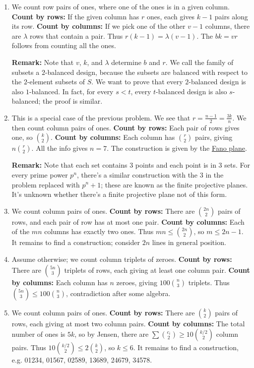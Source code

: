 \documentclass[11pt,paper=letter]{scrartcl}
\newcommand{\cbyrows}{{\bfseries \color{RowBlue} Count by rows: }}
\newcommand{\cbycols}{{\bfseries \color{ColOrange} Count by columns: }}
\begin{document}
\begin{enumerate}

\item We count row pairs of ones, where one of the ones is in a given column. \cbyrows If the given column has $r$ ones, each gives $k-1$ pairs along its row. \cbycols If we pick one of the other $v-1$ columns, there are $\lambda$ rows that contain a pair. Thus $r(k-1) = \lambda(v-1)$. The $bk = vr$ follows from counting all the ones.

\textbf{Remark:} Note that $v$, $k$, and $\lambda$ determine $b$ and $r$. We call the family of subsets a $2$-balanced design, because the subsets are balanced with respect to the $2$-element subsets of $S$. We want to prove that every $2$-balanced design is also $1$-balanced. In fact, for every $s < t$, every $t$-balanced design is also $s$-balanced; the proof is similar.

\item This is a special case of the previous problem. We see that $r = \frac{n-1}2 = \frac{3k}{n}$. We then count column pairs of ones. \cbyrows Each pair of rows gives one, so $\binom k2$. \cbycols Each column has $\binom r2$ pairs, giving $n\binom r2$. All the info gives $n = 7$. The construction is given by the \href{https://en.wikipedia.org/wiki/Fano_plane}{Fano plane}.

\textbf{Remark:} Note that each set contains $3$ points and each point is in $3$ sets. For every prime power $p^n$, there's a similar construction with the $3$ in the problem replaced with $p^n + 1$; these are known as the finite projective planes. It's unknown whether there's a finite projective plane not of this form.

\item We count column pairs of ones. \cbyrows There are $ \binom{2n}{2} $ pairs of rows, and each pair of row has at most one pair. \cbycols Each of the $mn$ columns has exactly two ones. Thus $mn \le \binom{2n}{2}$, so $m \le 2n - 1$. It remains to find a construction; consider $2n$ lines in general position.

\item Assume otherwise; we count column triplets of zeroes. \cbyrows There are $\binom{5n}{3}$ triplets of rows, each giving at least one column pair. \cbycols Each column has $n$ zeroes, giving $100 \binom{n}{3}$ triplets. Thus $\binom{5n}{3} \le 100 \binom{n}{3}$, contradiction after some algebra.

\item We count column pairs of ones. \cbyrows There are $\binom{k}{2}$ pairs of rows, each giving at most two column pairs. \cbycols The total number of ones is $5k$, so by Jensen, there are $\sum \binom{c_i}{2} \ge 10 \binom{k/2}{2}$ column pairs. Thus $10\binom{k/2}{2} \le 2\binom{k}{2}$, so $k \le 6$. It remains to find a construction, e.g. 01234, 01567, 02589, 13689, 24679, 34578.


\end{enumerate}
\end{document}
